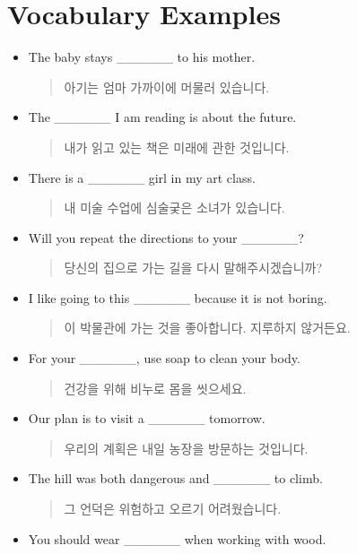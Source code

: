 \documentclass{article}
\begin{document}
\renewcommand{\familydefault}{\sfdefault}
\onehalfspacing
\fontsize{12pt}{14pt}\selectfont

\section*{Vocabulary Examples}
\begin{addmargin}[1em]{1em}
\begin{itemize}
    \item The baby stays \_\_\_\_\_\_ to his mother.
    \begin{quote}
    아기는 엄마 가까이에 머물러 있습니다.
    \end{quote}
    \item The \_\_\_\_\_\_ I am reading is about the future.
    \begin{quote}
    내가 읽고 있는 책은 미래에 관한 것입니다.
    \end{quote}
    \item There is a \_\_\_\_\_\_ girl in my art class.
    \begin{quote}
    내 미술 수업에 심술궂은 소녀가 있습니다.
    \end{quote}
    \item Will you repeat the directions to your \_\_\_\_\_\_?
    \begin{quote}
    당신의 집으로 가는 길을 다시 말해주시겠습니까?
    \end{quote}
    \item I like going to this \_\_\_\_\_\_ because it is not boring.
    \begin{quote}
    이 박물관에 가는 것을 좋아합니다. 지루하지 않거든요.
    \end{quote}
    \item For your \_\_\_\_\_\_, use soap to clean your body.
    \begin{quote}
    건강을 위해 비누로 몸을 씻으세요.
    \end{quote}
    \item Our plan is to visit a \_\_\_\_\_\_ tomorrow.
    \begin{quote}
    우리의 계획은 내일 농장을 방문하는 것입니다.
    \end{quote}
    \item The hill was both dangerous and \_\_\_\_\_\_ to climb.
    \begin{quote}
    그 언덕은 위험하고 오르기 어려웠습니다.
    \end{quote}
    \item You should wear \_\_\_\_\_\_ when working with wood.

\end{itemize}
\end{addmargin}
\end{document}

